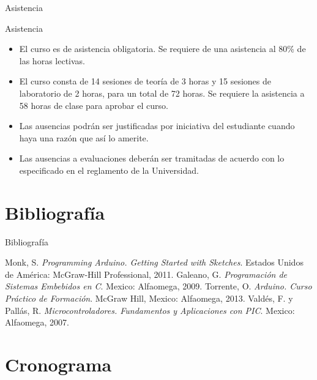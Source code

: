 \documentclass[handout,xcolor=dvipsnames]{beamer}
\newcommand{\pageframe}[1]{\frame{\begin{center}{ \Huge #1 }\end{center}}}
\begin{document}
\begin{frame}{Asistencia}
\begin{block}{Asistencia}
  \begin{itemize}[<+->]
    \item El curso es de asistencia obligatoria. Se requiere de una asistencia al 80\% de las horas lectivas.
    \item El curso consta de 14 sesiones de teoría de 3 horas y 15 sesiones de laboratorio de 2 horas, para un total de 72 horas. Se requiere la asistencia a 58 horas de clase para aprobar el curso.
    \item Las ausencias podrán ser justificadas por iniciativa del estudiante cuando haya una razón que así lo amerite.
    \item Las ausencias a evaluaciones deberán ser tramitadas de acuerdo con lo especificado en el reglamento de la Universidad.
  \end{itemize}
\end{block}
\end{frame}

\section{Bibliografía}

\pageframe{Bibliografía}
\nocite{*}

\begin{frame}{Bibliografía}

\begin{thebibliography}{5}
  Monk, S. 
  \textit{Programming Arduino. Getting Started with Sketches}.
  Estados Unidos de América: McGraw-Hill Professional,
  2011.
  Galeano, G.
  \textit{Programación de Sistemas Embebidos en C}.
  Mexico: Alfaomega,
  2009.
  Torrente, O.
  \textit{Arduino. Curso Práctico de Formación}.
  McGraw Hill,
  Mexico: Alfaomega,
  2013.
  Valdés, F. y Pallás, R.
  \textit{Microcontroladores. Fundamentos y Aplicaciones con PIC}.
  Mexico: Alfaomega,
  2007.
\end{thebibliography}

\end{frame}

\section{Cronograma}

\pageframe{Cronograma}
\end{document}
